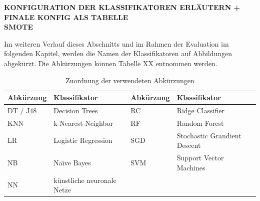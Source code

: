 \textbf{KONFIGURATION DER KLASSIFIKATOREN ERLÄUTERN + FINALE KONFIG ALS TABELLE}\\\textbf{SMOTE}

Im weiteren Verlauf dieses Abschnitts und im Rahmen der Evaluation im folgenden Kapitel, werden die Namen der Klassifikatoren auf Abbildungen abgekürzt. Die Abkürzungen können Tabelle XX entnommen werden.

\begin{table}
\centering
\caption{Zuordnung der verwendeten Abkürzungen}
\label{tab:abbs}
\begin{tabular}{ll|ll}
\textbf{Abkürzung} & \textbf{Klassifikator} & \textbf{Abkürzung} & \textbf{Klassifikator} \\ 
\hline
DT / J48 & Decision Trees & RC & Ridge Classifier \\
KNN & k-Nearest-Neighbor & RF & Random Forest \\
LR & Logistic Regression & SGD & Stochastic Grandient Descent \\
NB & Na\"{\i}ve Bayes & SVM & Support Vector Machines \\
NN & künstliche neuronale Netze &  & 
\end{tabular}
\end{table}

